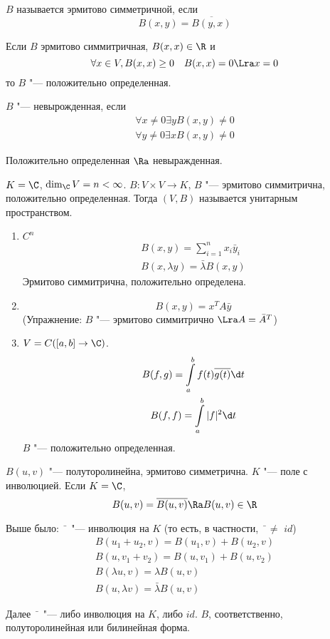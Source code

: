 \begin{Def}
	$B$ называется эрмитово симметричной, если
	\[ B(x, y) = \overline{B(y, x)} \]
\end{Def}

\begin{Def}
	Если $B$ эрмитово симмитричная, $B(x, x) \in \R$ и 
	\[ \forall x \in V, B(x, x) \ge 0 \quad B(x, x) = 0 \Lra x = 0 \]
	то $B$ "--- положительно определенная.
\end{Def}

\begin{Def}
	$B$ "--- невырожденная, если
	\begin{gather*}
		\forall x \ne 0 \exists y B(x, y) \ne 0 \\
		\forall y \ne 0 \exists x B(x, y) \ne 0
	\end{gather*}
\end{Def}
Положительно определенная $\Ra$ невыражденная.

\begin{Def}
	$K = \C$, $\dim_{\C}V = n < \infty$.
	$B \colon V \times V \to K$, $B$ "--- эрмитово симмитрична, положительно определенная.
	Тогда $(V, B)$ называется унитарным пространством.
\end{Def}

\begin{exmp}
	\begin{enumerate}
	\item
		$C^n$
		\begin{gather*}
			B(x, y) = \sum_{i=1}^n x_i\bar y_i \\
			B(x, \lambda y) = \bar\lambda B(x, y)
		\end{gather*}
		Эрмитово симмитрична, положительно определена.

	\item
		\[ B(x, y) = x^TA\bar y \]
		(Упражнение: $B$ "--- эрмитово  симмитрично $\Lra A  = \bar A^T$)
	
	\item
		$V = C([a, b] \to \C)$.
		\begin{gather*}
			B(f, g) = \int\limits_a^b f(t)\overline{g(t)}\d t \\
			B(f, f) = \int\limits_a^b |f|^2\d t
		\end{gather*}
		$B$ "--- положительно определенная.
	\end{enumerate}
\end{exmp}

$B(u, v)$ "--- полуторолинейна, эрмитово симметрична.
$K$ "--- поле с инволюцией.
Если $K = \C$,
\[ B(u, v) = \overline{B(u, v)} \Ra B(u, v) \in \R \]

Выше было: $\bar{\phantom{x}}$ "--- инволюция на $K$ (то есть, в частности, $\bar{\phantom{x}} \ne$ $id$)
\begin{gather*}
	B(u_1 + u_2, v) = B(u_1, v) + B(u_2, v) \\
	B(u, v_1 + v_2) = B(u, v_1) + B(u, v_2) \\
	B(\lambda u, v) = \lambda B(u, v) \\
	B(u, \lambda v) = \bar\lambda B(u, v)
\end{gather*}

Далее $\bar{\phantom{x}}$ "--- либо инволюция на $K$, либо $id$.
$B$, соответственно, полуторолинейная или билинейная форма.
